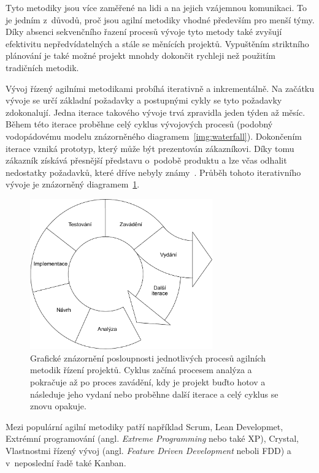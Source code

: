 Tyto metodiky jsou více zaměřené na lidi a na jejich vzájemnou komunikaci. To je jedním z~důvodů, proč jsou agilní metodiky vhodné především pro menší týmy. Díky absenci sekvenčního řazení procesů vývoje tyto metody také zvyšují efektivitu nepředvídatelných a stále se měnících projektů. Vypuštěním striktního plánování je také možné projekt mnohdy dokončit rychleji než použitím tradičních metodik.

Vývoj řízený agilními metodikami probíhá iterativně a inkrementálně. Na začátku vývoje se určí základní požadavky a postupnými cykly se tyto požadavky zdokonalují. Jedna iterace takového vývoje trvá zpravidla jeden týden až měsíc. Během této iterace proběhne celý cyklus vývojových procesů (podobný vodopádovému modelu znázorněného diagramem~\ref{img:waterfall}). Dokončením iterace vzniká prototyp, který může být prezentován zákazníkovi. Díky tomu zákazník získává přesnější představu o~podobě produktu a lze včas odhalit nedostatky požadavků, které dříve nebyly známy~\cite{bib:agile-impact}. 
Průběh tohoto iterativního vývoje je znázorněný diagramem~\ref{img:agile}.

\begin{figure}[H]
	\centering
	\includegraphics[width=0.7\textwidth]{obrazky-figures/agile.pdf}
	\caption{Grafické znázornění posloupnosti jednotlivých procesů agilních metodik řízení projektů. Cyklus začíná procesem analýza a pokračuje až po proces zavádění, kdy je projekt buďto hotov a následuje jeho vydaní nebo proběhne další iterace a celý cyklus se znovu opakuje.}
	\label{img:agile}
\end{figure}

Mezi populární agilní metodiky patří například Scrum, Lean Developmet, Extrémní programování (angl. \emph{Extreme Programming} nebo také XP), Crystal, Vlastnostmi řízený vývoj (angl. \emph{Feature Driven Development} neboli FDD) a v~neposlední řadě také Kanban.

